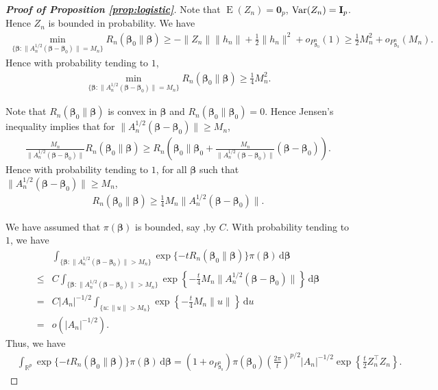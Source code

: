 \documentclass[11pt]{article}
\DeclareMathOperator{\myE}{E}
\DeclareMathOperator{\myVar}{Var}
\newcommand{\myT}{\intercal}
\newcommand{\bfsym}[1]{\ensuremath{\boldsymbol{#1}}}
\def\bbeta{\bfsym \beta}
\theoremstyle{plain}
\theoremstyle{definition}
\theoremstyle{remark}
\begin{document}
\begin{proof}[\textbf{Proof of Proposition \ref{prop:logistic}}]
Note that $\myE (Z_n) = \mathbf 0_p$, $\myVar (Z_n) = \BI_p$.
Hence $Z_n$ is bounded in probability.
We have
\begin{align*}
    \min_{\{\bbeta : \|A_n^{1/2}(\bbeta - \bbeta_0)\| = M_n\}} 
R_n (\bbeta_0 \| \bbeta )
\geq 
-\|Z_n\| \|h_n\|
+ \frac{1} {2} \|h_n\|^2 + o_{P_{\bbeta_0}^n}(1)
\geq 
 \frac{1} {2} M_n^2 + o_{P_{\bbeta_0}^n}(M_n)
.
\end{align*}
Hence with probability tending to $1$,
\begin{align*}
    \min_{\{\bbeta : \|A_n^{1/2}(\bbeta - \bbeta_0)\| = M_n\}} 
R_n (\bbeta_0 \| \bbeta )
\geq 
 \frac{1} {4} M_n^2
.
\end{align*}

Note that $R_n(\bbeta_0 \| \bbeta)$ is convex in $\bbeta$ and $R_n (\bbeta_0 \| \bbeta_0) = 0$.
Hence Jensen's inequality implies that for $\|A_n^{1/2}(\bbeta - \bbeta_0)\| \geq M_n$, 
\begin{align*}
    \frac{M_n}{\|A_n^{1/2}(\bbeta - \bbeta_0)\|} R_n (\bbeta_0 \| \bbeta )
    \geq R_n \left( \bbeta_0 \| \bbeta_0 + \frac{M_n}{\|A_n^{1/2}(\bbeta - \bbeta_0)\|} (\bbeta - \bbeta_0)\right).
\end{align*}
Hence with probability tending to $1$, for all $\bbeta$ such that $\|A_n^{1/2}(\bbeta - \bbeta_0)\| \geq M_n$,
\begin{align*}
     R_n (\bbeta_0 \| \bbeta )
    \geq
    \frac 1 4 M_n
{\|A_n^{1/2}(\bbeta - \bbeta_0)\|}
    .
\end{align*}

We have assumed that $\pi(\bbeta)$ is bounded, say ,by $C$.
With probability tending to $1$, we have
\begin{align*}
    &
    \int_{\{\bbeta : \|A_n^{1/2}(\bbeta - \bbeta_0)\| > M_n \}} 
    \exp\{-t R_n (\bbeta_0 \| \bbeta)\} \pi(\bbeta) \, \mathrm d \bbeta
    \\
    \leq&
    C
    \int_{\{\bbeta :  \|A_n^{1/2}(\bbeta - \bbeta_0)\| > M_n \}} 
    \exp \left\{-\frac{t}{4} M_n \|A_n^{1/2}(\bbeta - \bbeta_0)\| \right\}  \, \mathrm d \bbeta
    \\
    =&
    C
    |A_n|^{-1/2}
    \int_{\{u : \|u\| > M_n \}} 
    \exp \left\{-\frac{t}{4} M_n \| u \| \right\}  \, \mathrm d u
    \\
    =&
    o(
    |A_n|^{-1/2}
).
\end{align*}
Thus, we have
\begin{align*}
    &
    \int_{\mathbb R^p} 
    \exp\{-t R_n (\bbeta_0 \| \bbeta)\} \pi(\bbeta) \, \mathrm d \bbeta
    =
(1+o_{P_{\bbeta_0}^n})\pi(\bbeta_0)
\left( \frac {2\pi}{t} \right)^{p/2} |A_n|^{-1/2} \exp \left\{\frac{t}{2} Z_n^\myT Z_n \right\}.
\end{align*}




\end{proof}
\end{document}
